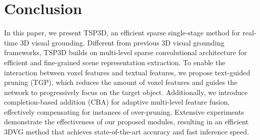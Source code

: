 \section{Conclusion}
\label{sec:conclu}

In this paper, we present TSP3D, an efficient sparse single-stage method for real-time 3D visual grounding. Different from previous 3D visual grounding frameworks, TSP3D builds on multi-level sparse convolutional architecture for efficient and fine-grained scene representation extraction. To enable the interaction between voxel features and textual features, we propose text-guided pruning (TGP), which reduces the amount of voxel features and guides the network to progressively focus on the target object. Additionally, we introduce completion-based addition (CBA) for adaptive multi-level feature fusion, effectively compensating for instances of over-pruning. Extensive experiments demonstrate the effectiveness of our proposed modules, resulting in an efficient 3DVG method that achieves state-of-the-art accuracy and fast inference speed.

